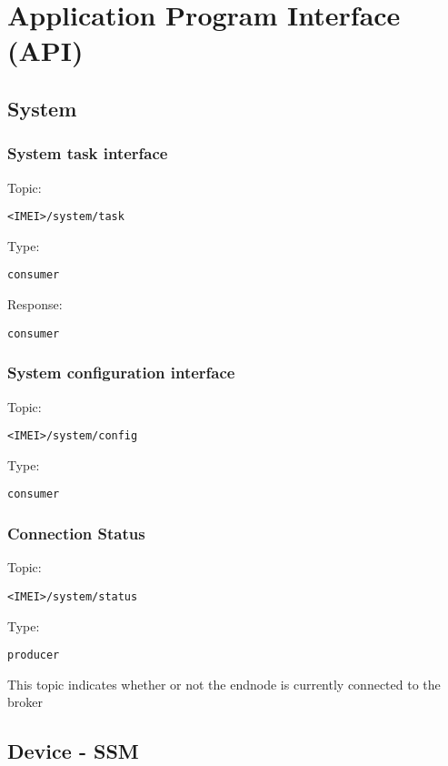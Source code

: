 \section{Application Program Interface (API)}

\subsection{System}

\subsubsection{System task interface}

Topic:
\begin{lstlisting}<IMEI>/system/task\end{lstlisting}
Type:
\begin{lstlisting}consumer\end{lstlisting}
Response:
\begin{lstlisting}consumer\end{lstlisting}

\subsubsection{System configuration interface}

Topic:
\begin{lstlisting}<IMEI>/system/config\end{lstlisting}
Type:
\begin{lstlisting}consumer\end{lstlisting}
    
\subsubsection{Connection Status}

Topic:
\begin{lstlisting}<IMEI>/system/status\end{lstlisting}
Type:
\begin{lstlisting}producer\end{lstlisting}
    
This topic indicates whether or not the endnode is currently connected to the broker


\subsection{Device - SSM}

